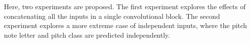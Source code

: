 
Here, two experiments are proposed. The first experiment
explores the effects of concatenating all the inputs in a
single convolutional block. The second experiment explores a
more extreme case of independent inputs, where the pitch
note letter and pitch class are predicted independently.

